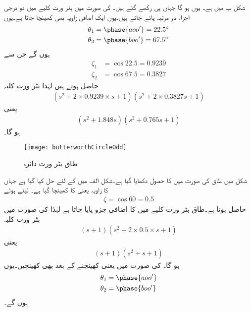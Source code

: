 شکل  ب میں  ہے۔
یوں  ہو گا جہاں  ہی رکھے گئے ہیں۔ کی  صورت میں بٹر ورت کلیے میں دو درجی اجزاء دو مرتبہ پائے جاتے ہیں۔یوں ایک اضافی زاویہ  بھی کھینچا جاتا ہے۔یوں
\begin{align*}
\theta_1&=\phase{aoo'}=\SI{22.5}{\degree}\\
\theta_2&=\phase{boo'}=\SI{67.5}{\degree}
\end{align*}
ہوں گے جن سے
\begin{align*}
\zeta_1&=\cos 22.5=0.9239\\
\zeta_2&=\cos 67.5=0.3827
\end{align*}
حاصل ہوتے ہیں لہٰذا بٹر ورت کلیہ     
\begin{align*}
\left(s^2+2 \times 0.9239 \times s +1\right) \left(s^2+2 \times 0.3827s+1 \right)
\end{align*}
یعنی
\begin{align*}
\left(s^2+1.848s \right) \left(s^2+0.765s+1 \right)
\end{align*}
ہو گا۔
%
\begin{figure}
\centering
\texttt{[image: butterworthCircleOdd]}
\caption{طاق بٹر ورت دائرہ}
\label{شکل_تعددی_ردعمل_بٹر_ورت_دائرہ_طاق}
\end{figure}
شکل  میں طاق  کی صورت میں  کا حصول دکھایا گیا ہے۔شکل  الف میں  کے لئے حل کیا گیا ہے جہاں  کا زاویہ  یعنی  کا کھینچا گیا ہے۔ لیتے ہوئے
\begin{align*}
\zeta=\cos 60=0.5
\end{align*}
حاصل ہوتا ہے۔طاق بٹر ورت کلیے      میں  کا اضافی جزو پایا جاتا ہے لہٰذا  کی صورت میں بٹر ورت کلیہ     
\begin{align*}
\left(s+1 \right)\left(s^2+2 \times 0.5 \times s+ 1\right)
\end{align*}
یعنی
\begin{align*}
\left(s+1 \right)\left(s^2+ s+1 \right)
\end{align*}
ہو گا۔ کی صورت میں  یعنی  کھینچنے کے بعد  بھی  کھینچیں۔یوں
\begin{align*}
\theta_1&=\phase{aoo'}\\
\theta_2&=\phase{boo'}
\end{align*}
ہوں گے۔

